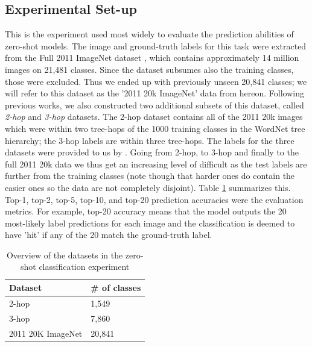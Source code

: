 \documentclass[12pt]{report}
\begin{document}
\subsection{Experimental Set-up}
This is the experiment used most widely to evaluate the prediction abilities of zero-shot models. The image and ground-truth labels for this task were extracted from the Full 2011 ImageNet dataset \cite{JiaDeng2009}, which contains approximately 14 million images on 21,481 classes. Since the dataset subsumes also the training classes, those were excluded. Thus we ended up with previously unseen 20,841 classes; we will refer to this dataset as the '2011 20k ImageNet' data from hereon. Following previous works, we also constructed two additional subsets of this dataset, called \textit{2-hop} and \textit{3-hop} datasets. The 2-hop dataset contains all of the 2011 20k images which were within two tree-hops of the 1000 training classes in the WordNet tree hierarchy; the 3-hop labels are within three tree-hops. The labels for the three datasets were provided to us by \cite{Norouzi2013}. Going from 2-hop, to 3-hop and finally to the full 2011 20k data we thus get an increasing level of difficult as the test labels are further from the training classes (note though that harder ones do contain the easier ones so the data are not completely disjoint). Table \ref{tbl:zsldata} summarizes this. Top-1, top-2, top-5, top-10, and top-20 prediction accuracies were the evaluation metrics. For example, top-20 accuracy means that the model outputs the 20 most-likely label predictions for each image and the classification is deemed to have 'hit' if any of the 20 match the ground-truth label.
\begin{table}
\centering
\begin{tabular}{|l|l|}
\hline
\textbf{Dataset}  & \textbf{\# of classes} \\ \hline
2-hop             & 1,549                  \\
3-hop             & 7,860                  \\
2011 20K ImageNet & 20,841                 \\ \hline
\end{tabular}
\caption{Overview of the datasets in the zero-shot classification experiment}
\label{tbl:zsldata}
\end{table}
\end{document}
